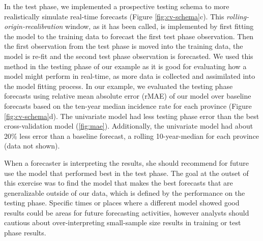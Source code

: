 \documentclass[a4paper]{article}
\newcommand{\eg}{\textit{e}.\textit{g}. }
\begin{document}
In the test phase, we implemented a prospective testing schema to more realistically simulate real-time forecasts (Figure \ref{fig:cv-schema}c).
This \textit{rolling-origin-recalibration} window, as it has been called\cite{Bergmeir2012}, is implemented by first fitting the model to the training data to forecast the first test phase observation. Then the first observation from the test phase is moved into the training data, the model is re-fit and the second test phase observation is forecasted.
We used this method in the testing phase of our example as it is good for evaluating how a model might perform in real-time, as more data is collected and assimilated into the model fitting process.
In our example, we evaluated the testing phase forecasts using relative mean absolute error (rMAE) of our model over baseline forecasts based on the ten-year median incidence rate for each province (Figure \ref{fig:cv-schema}d).
The univariate model had less testing phase error than the best cross-validation model (\autoref{fig:mae}). 
Additionally, the univariate model had about 20\% less error than a baseline forecast, a rolling 10-year-median for each province (data not shown).

When a forecaster is interpreting the results, she should recommend for future use the model that performed best in the test phase.
The goal at the outset of this exercise was to find the model that makes the best forecasts that are generalizable outside of our data, which is defined by the performance on the testing phase.
Specific times or places where a different model showed good results could be areas for future forecasting activities, however analysts should cautious about over-interpreting small-sample size results in training or test phase results.
\end{document}
